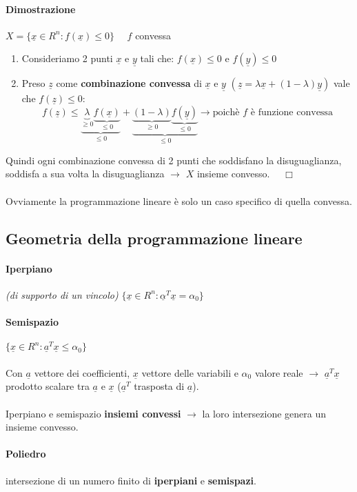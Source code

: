 \documentclass[12pt, twoside, letterpaper]{article}
\newcommand{\vx}[0]{
	\underline{x}
}
\newcommand{\va}[0]{
	\underline{a}
}
\newcommand{\vy}[0]{
	\underline{y}
}
\newcommand{\vz}[0]{
	\underline{z}
}
\newcommand{\fx}[0]{
	f(\underline{x})
}
\newcommand{\fy}[0]{
	f(\underline{y})
}
\newcommand{\fz}[0]{
	f(\underline{z})
}
\begin{document}
				\paragraph{Dimostrazione}
					$X = \{ \vx \in R^n : \fx \leq 0 \} \quad$ $f$ convessa
					\begin{enumerate}
						\item Consideriamo 2 punti $\vx$ e $\vy$ tali che: $\fx \leq 0$ e $\fy \leq 0$
						\item Preso $\vz$ come \textbf{combinazione convessa} di $\vx$ e $\vy$ $(\vz = \lambda \vx + (1-\lambda)\vy)$ vale che $\fz \leq 0$: $$\fz \leq \underbrace{\underbrace{\lambda}_{\geq 0} \underbrace{\fx}_{\leq 0}}_{\leq 0} + \underbrace{\underbrace{(1-\lambda)}_{\geq 0} \underbrace{\fy}_{\leq 0}}_{\leq 0} \rightarrow \text{poichè $f$ è funzione convessa}$$ 
					\end{enumerate}
					Quindi ogni combinazione convessa di 2 punti che soddisfano la disuguaglianza, soddisfa a sua volta la disuguaglianza $\rightarrow$ $X$ insieme convesso. $\quad \Box$\\\\
				Ovviamente la programmazione lineare è solo un caso specifico di quella convessa.
		\subsection{Geometria della programmazione lineare}
			\paragraph{Iperpiano} \textit{(di supporto di un vincolo)} $\{\vx \in R^n: \underline{\alpha}^T \vx = \alpha_0 \}$
			\paragraph{Semispazio} $\{ \vx \in R^n: \va^T \vx \leq \alpha_0 \}$\\\\
			Con $\va$ vettore dei coefficienti, $\vx$ vettore delle variabili e $\alpha_0$ valore reale $\rightarrow$ $\va^T \vx$ prodotto scalare tra $\va$ e $\vx$ ($\va^T$ trasposta di $\va$).\\\\
			Iperpiano e semispazio \textbf{insiemi convessi} $\rightarrow$ la loro intersezione genera un insieme convesso.
			\paragraph{Poliedro} intersezione di un numero finito di \textbf{iperpiani} e \textbf{semispazi}.
\end{document}

